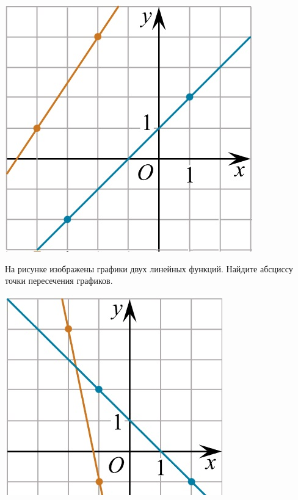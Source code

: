\begin{homework}[number=2]
\begin{listofex}
\begin{minipage}[c]{0.25\textwidth}
			\includegraphics[width=\textwidth]{pics/G101M4H2-2.jpg}
		\end{minipage}
		\item 
		\begin{minipage}[t]{0.67\textwidth}
			На рисунке изображены графики двух линейных функций. Найдите абсциссу точки пересечения графиков.
		\end{minipage}
		\begin{minipage}[c]{0.25\textwidth}
			\includegraphics[width=\textwidth]{pics/G101M4H2-3.jpg}

\end{minipage}
\end{listofex}
\end{homework}
